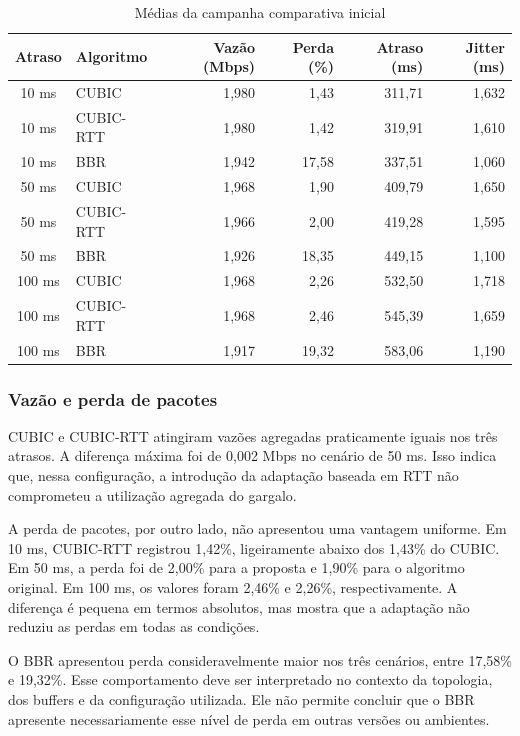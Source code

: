 \documentclass[a4paper,12pt]{monografia}
\begin{document}
\begin{table}[htbp]
\centering
\caption{Médias da campanha comparativa inicial}
\label{tab:resultados-iniciais}
\small
\begin{tabular}{c l r r r r}
\toprule
\textbf{Atraso} & \textbf{Algoritmo} & \textbf{Vazão (Mbps)} & \textbf{Perda (\%)} & \textbf{Atraso (ms)} & \textbf{Jitter (ms)} \\
\midrule
10 ms & CUBIC & 1,980 & 1,43 & 311,71 & 1,632 \\
10 ms & CUBIC-RTT & 1,980 & 1,42 & 319,91 & 1,610 \\
10 ms & BBR & 1,942 & 17,58 & 337,51 & 1,060 \\
\midrule
50 ms & CUBIC & 1,968 & 1,90 & 409,79 & 1,650 \\
50 ms & CUBIC-RTT & 1,966 & 2,00 & 419,28 & 1,595 \\
50 ms & BBR & 1,926 & 18,35 & 449,15 & 1,100 \\
\midrule
100 ms & CUBIC & 1,968 & 2,26 & 532,50 & 1,718 \\
100 ms & CUBIC-RTT & 1,968 & 2,46 & 545,39 & 1,659 \\
100 ms & BBR & 1,917 & 19,32 & 583,06 & 1,190 \\
\bottomrule
\end{tabular}
\end{table}

\subsubsection{Vazão e perda de pacotes}

CUBIC e CUBIC-RTT atingiram vazões agregadas praticamente iguais nos três atrasos. A diferença máxima foi de 0,002 Mbps no cenário de 50 ms. Isso indica que, nessa configuração, a introdução da adaptação baseada em RTT não comprometeu a utilização agregada do gargalo.

A perda de pacotes, por outro lado, não apresentou uma vantagem uniforme. Em 10 ms, CUBIC-RTT registrou 1,42\%, ligeiramente abaixo dos 1,43\% do CUBIC. Em 50 ms, a perda foi de 2,00\% para a proposta e 1,90\% para o algoritmo original. Em 100 ms, os valores foram 2,46\% e 2,26\%, respectivamente. A diferença é pequena em termos absolutos, mas mostra que a adaptação não reduziu as perdas em todas as condições.

O BBR apresentou perda consideravelmente maior nos três cenários, entre 17,58\% e 19,32\%. Esse comportamento deve ser interpretado no contexto da topologia, dos buffers e da configuração utilizada. Ele não permite concluir que o BBR apresente necessariamente esse nível de perda em outras versões ou ambientes.
\end{document}
